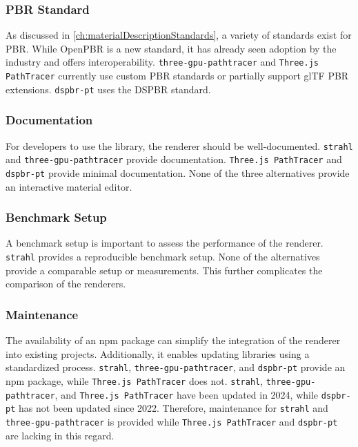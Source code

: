 \subsubsection*{PBR Standard}

As discussed in \autoref{ch:materialDescriptionStandards}, a variety of standards exist for \gls{PBR}. While \gls{OpenPBR} is a new standard, it has already seen adoption by the industry and offers interoperability. \texttt{three-gpu-pathtracer} and \texttt{Three.js PathTracer} currently use custom \gls{PBR} standards or partially support \gls{glTF} \gls{PBR} extensions. \texttt{dspbr-pt} uses the \gls{DSPBR} standard.

\subsubsection*{Documentation}

For developers to use the library, the renderer should be well-documented. \texttt{strahl} and \texttt{three-gpu-pathtracer} provide documentation. \texttt{Three.js PathTracer} and \texttt{dspbr-pt} provide minimal documentation. None of the three alternatives provide an interactive material editor.

\subsubsection*{Benchmark Setup}

A benchmark setup is important to assess the performance of the renderer. \texttt{strahl} provides a reproducible benchmark setup. None of the alternatives provide a comparable setup or measurements. This further complicates the comparison of the renderers.

\subsubsection*{Maintenance}

The availability of an \gls{npm} package can simplify the integration of the renderer into existing projects. Additionally, it enables updating libraries using a standardized process. \texttt{strahl}, \texttt{three-gpu-pathtracer}, and \texttt{dspbr-pt} provide an \gls{npm} package, while \texttt{Three.js PathTracer} does not. \texttt{strahl}, \texttt{three-gpu-pathtracer}, and \texttt{Three.js PathTracer} have been updated in 2024, while \texttt{dspbr-pt} has not been updated since 2022. Therefore, maintenance for \texttt{strahl} and \texttt{three-gpu-pathtracer} is provided while \texttt{Three.js PathTracer} and \texttt{dspbr-pt} are lacking in this regard.

